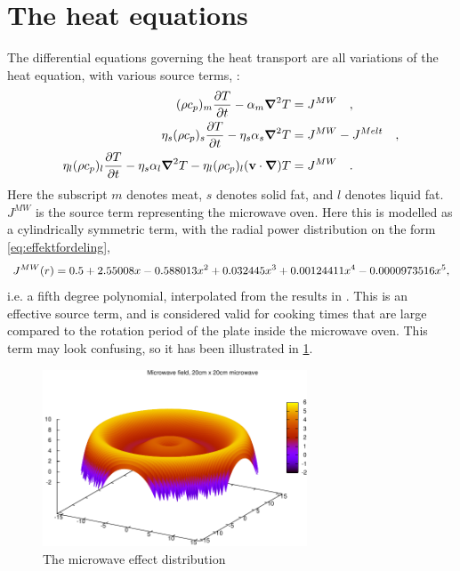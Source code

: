 \section{The heat equations}
The differential equations governing the heat transport are all variations of the heat
equation, with various source terms, :
\begin{align}
  \label{eq:heat1}
  (\rho c_p)_m \frac{\partial T}{\partial t} - \alpha_m \mbox{\boldmath$ \nabla $} ^2 T &= J^{MW} \quad \rm{,} \\
  \label{eq:heat2}
  \eta_s (\rho c_p)_s \frac{\partial T}{\partial t} - \eta_s\alpha_s \mbox{\boldmath$ \nabla $} ^2 T &= J^{MW} - J^{Melt}  \quad \rm{,} \\
  \label{eq:heat3}
  \eta_l (\rho c_p)_l \frac{\partial T}{\partial t} - \eta_s\alpha_l \mbox{\boldmath$ \nabla $} ^2 T - \eta_l(\rho c_p)_l(\mathbf{v}\cdot
  \mbox{\boldmath$ \nabla $})T &= J^{MW}  \quad \rm{.}
\end{align}
Here the subscript $m$ denotes meat, $s$ denotes solid fat, and $l$ denotes
liquid fat. $J^{MW}$ is the source term representing the microwave oven.
Here this is modelled as a cylindrically symmetric term,
with the radial power distribution on the form \cref{eq:effektfordeling},
\begin{equation}
  J^{MW}(r) = 0.5 + 2.55008x - 0.588013x^2 + 0.032445x^3 + 0.00124411x^4 - 0.0000973516x^5 \rm{,}
  \label{eq:effektfordeling}
\end{equation}
i.e. a fifth degree polynomial, interpolated from the results in
\cite{huang+zhu}. This is an effective source term, and is considered valid for
cooking times that are large compared to the rotation period of the plate inside
the microwave oven. This term may look confusing, so it has been illustrated in
\cref{fig:microwave}.\\

\begin{figure}[h!]
  \begin{center}
    \includegraphics[width=0.7\textwidth]{microwave.pdf}
  \end{center}
  \caption{The microwave effect distribution}
  \label{fig:microwave}
\end{figure}


